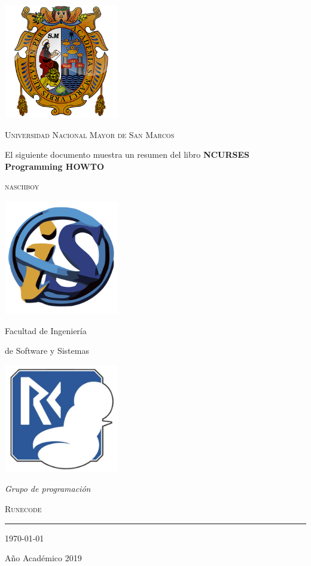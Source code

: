 \documentclass[a4paper,12pt]{book}
\begin{document}
\begin{titlepage}
	\vspace*{-3cm}
	\centering
		\includegraphics[width=5cm]{./escudo_UNMSM.png}
    

	{\scshape\LARGE Universidad Nacional Mayor de San Marcos\par}

	\vspace{1cm}

  {\large El siguiente documento muestra un resumen del libro \textbf{NCURSES Programming HOWTO} \par}

	\vspace{.1\textheight}
  { \LARGE \scshape nasciiboy}

	\vspace{.07\textheight}

	\parbox{.4\linewidth}{
			\includegraphics[width=5cm]{./escudo_FISI.png}\par
			{Facultad de Ingeniería\par
			de Software y Sistemas}
		}\hfill
	\parbox{.5\linewidth}{
		\raggedleft
			\includegraphics[width=5cm]{./captura.jpg}\par
			\emph{Grupo de programación}\par
			\textsc{Runecode}%
	}

		\vspace{.1\linewidth}

			\vfill

			\rule{.4\textwidth}{.4pt}

	{\large \today\par
	Año Académico 2019\par}

\end{titlepage}
\end{document}
